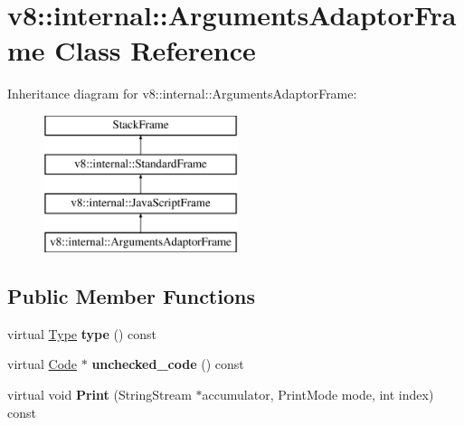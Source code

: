 \hypertarget{classv8_1_1internal_1_1_arguments_adaptor_frame}{}\section{v8\+:\+:internal\+:\+:Arguments\+Adaptor\+Frame Class Reference}
\label{classv8_1_1internal_1_1_arguments_adaptor_frame}
Inheritance diagram for v8\+:\+:internal\+:\+:Arguments\+Adaptor\+Frame\+:\begin{figure}[H]
\begin{center}
\leavevmode
\includegraphics[height=4.000000cm]{classv8_1_1internal_1_1_arguments_adaptor_frame}
\end{center}
\end{figure}
\subsection*{Public Member Functions}
\begin{DoxyCompactItemize}
\item 
\hypertarget{classv8_1_1internal_1_1_arguments_adaptor_frame_a857a8f2c67d69acfe6ab5aa251c4acd2}{}virtual \hyperlink{classv8_1_1internal_1_1_type_impl}{Type} {\bfseries type} () const \label{classv8_1_1internal_1_1_arguments_adaptor_frame_a857a8f2c67d69acfe6ab5aa251c4acd2}

\item 
\hypertarget{classv8_1_1internal_1_1_arguments_adaptor_frame_a7957757e8f971b3cfc216bb4de8313aa}{}virtual \hyperlink{classv8_1_1internal_1_1_code}{Code} $\ast$ {\bfseries unchecked\+\_\+code} () const \label{classv8_1_1internal_1_1_arguments_adaptor_frame_a7957757e8f971b3cfc216bb4de8313aa}

\item 
\hypertarget{classv8_1_1internal_1_1_arguments_adaptor_frame_a0f3df5c6dcb8a76a7f52ae47adb5ae22}{}virtual void {\bfseries Print} (String\+Stream $\ast$accumulator, Print\+Mode mode, int index) const \label{classv8_1_1internal_1_1_arguments_adaptor_frame_a0f3df5c6dcb8a76a7f52ae47adb5ae22}

\end{DoxyCompactItemize}
